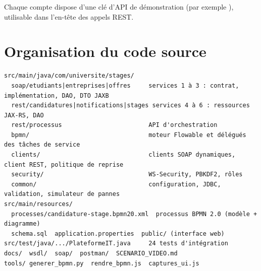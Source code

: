 Chaque compte dispose d'une clé d'API de démonstration  (par exemple
), utilisable dans l'en-tête  des appels REST.

\section{Organisation du code source}
\begin{lstlisting}
src/main/java/com/universite/stages/
  soap/etudiants|entreprises|offres     services 1 à 3 : contrat, implémentation, DAO, DTO JAXB
  rest/candidatures|notifications|stages services 4 à 6 : ressources JAX-RS, DAO
  rest/processus                        API d'orchestration
  bpmn/                                 moteur Flowable et délégués des tâches de service
  clients/                              clients SOAP dynamiques, client REST, politique de reprise
  security/                             WS-Security, PBKDF2, rôles
  common/                               configuration, JDBC, validation, simulateur de pannes
src/main/resources/
  processes/candidature-stage.bpmn20.xml  processus BPMN 2.0 (modèle + diagramme)
  schema.sql  application.properties  public/ (interface web)
src/test/java/.../PlateformeIT.java     24 tests d'intégration
docs/  wsdl/  soap/  postman/  SCENARIO_VIDEO.md
tools/ generer_bpmn.py  rendre_bpmn.js  captures_ui.js
\end{lstlisting}
